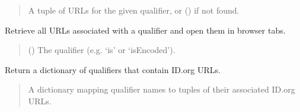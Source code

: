 \documentclass[letterpaper,12pt,english]{sphinxmanual}
\begin{document}
\begin{fulllineitems}
\begin{fulllineitems}
\begin{quote}
\begin{description}
\sphinxAtStartPar
{} \textendash{} A tuple of URLs for the given qualifier, or () if not found.

\end{description}\end{quote}

\end{fulllineitems}


\begin{fulllineitems}
\label{\detokenize{api/core:cbmpy.CBCommon.MIRIAMannotation.getAndViewUrisForQualifier}}
\pysigstartsignatures
\pysiglinewithargsret
{}
{}
{}
\pysigstopsignatures
\sphinxAtStartPar
Retrieve all URLs associated with a qualifier and open them in browser tabs.
\begin{quote}\begin{description}
\sphinxAtStartPar
{} () \textendash{} The qualifier (e.g. ‘is’ or ‘isEncoded’).

\sphinxAtStartPar
{}

\end{description}\end{quote}

\end{fulllineitems}


\begin{fulllineitems}
\label{\detokenize{api/core:cbmpy.CBCommon.MIRIAMannotation.getAllMIRIAMUris}}
\pysigstartsignatures
\pysiglinewithargsret
{}
{}
{}
\pysigstopsignatures
\sphinxAtStartPar
Return a dictionary of qualifiers that contain ID.org URLs.
\begin{quote}\begin{description}
\sphinxAtStartPar
{} \textendash{} A dictionary mapping qualifier names to tuples of their associated
ID.org URLs.


\end{description}
\end{quote}
\end{fulllineitems}
\end{fulllineitems}
\end{document}
